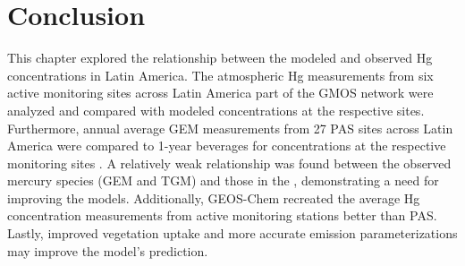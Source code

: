 \section{Conclusion}\label{c2_conclusion}
\begin{flushleft}
This chapter explored the relationship between the modeled and observed Hg concentrations in Latin America. The atmospheric Hg measurements from six active monitoring sites  across Latin America part of the GMOS network were analyzed and compared with modeled \hg concentrations at the respective sites\cite{koenig_seasonal_2021,sprovieri_atmospheric_2016}. Furthermore, annual average GEM measurements from 27 PAS sites across Latin America were compared to 1-year beverages for \hg concentrations at the respective monitoring sites \cite{quant_measuring_2021}.  A relatively weak relationship was found between the observed mercury species (GEM and TGM) and those in the \on, demonstrating a need for improving the models. Additionally, GEOS-Chem recreated the average Hg concentration measurements from active monitoring stations better than PAS. Lastly, improved vegetation uptake and more accurate emission parameterizations may improve the model's prediction.

\end{flushleft}